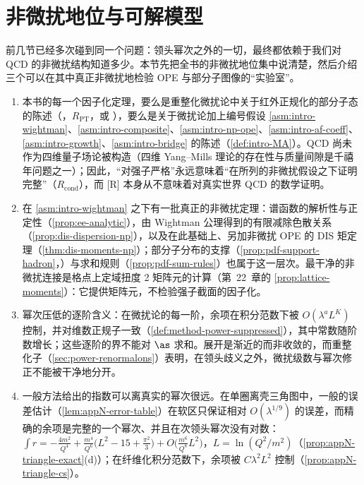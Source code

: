 \section{非微扰地位与可解模型}\label{sec:power-np}

前几节已经多次碰到同一个问题：领头幂次之外的一切，最终都依赖于我们对 QCD 的非微扰结构知道多少。本节先把全书的非微扰地位集中说清楚，然后介绍三个可以在其中真正非微扰地检验 OPE 与部分子图像的“实验室”。

\begin{remark}[非微扰地位]\label{rem:power-np-status}
\begin{enumerate}[label=(\roman*),leftmargin=1.8em,itemsep=2pt,topsep=2pt]
\item 本书的每一个因子化定理，要么是重整化微扰论中关于红外正规化的部分子态的陈述（\tagR，$R_{\mathrm{PT}}$，或 \tagA），要么是关于微扰论加上编号假设 \cref{asm:intro-wightman}、\cref{asm:intro-composite}、\cref{asm:intro-np-ope}、\cref{asm:intro-af-coeff}、\cref{asm:intro-growth}、\cref{asm:intro-bridge} 的陈述（\cref{def:intro-MA}）。QCD 尚未作为四维量子场论被构造（四维 Yang--Mills 理论的存在性与质量间隙是千禧年问题之一）；因此，“对强子严格”永远意味着“在所列的非微扰假设之下证明完整”（$R_{\mathrm{cond}}$），而 [R] 本身从不意味着对真实世界 QCD 的数学证明。%
\item 在 \cref{asm:intro-wightman} 之下有一批真正的非微扰定理：谱函数的解析性与正定性（\cref{prop:ee-analytic}），由 Wightman 公理得到的有限减除色散关系（\cref{prop:dis-dispersion-np}），以及在此基础上、另加非微扰 OPE 的 DIS 矩定理（\cref{thm:dis-moments-np}）；部分子分布的支撑（\cref{prop:pdf-support-hadron}，\tagA）与求和规则（\cref{prop:pdf-sum-rules}）也属于这一层次。最干净的非微扰连接是格点上定域扭度 2 矩阵元的计算（第~22~章的 \cref{prop:lattice-moments}）：它提供矩阵元，不检验强子截面的因子化。
\item 幂次压低的逐阶含义：在微扰论的每一阶，余项在积分范数下被 $O(\lambda^aL^K)$ 控制，并对维数正规子一致（\cref{def:method-power-suppressed}），其中常数随阶数增长；这些逐阶的界不能对 $\as$ 求和。展开是渐近的而非收敛的，而重整化子（\cref{sec:power-renormalons}）表明，在领头歧义之外，微扰级数与幂次修正不能被干净地分开。
\item 一般方法给出的指数可以离真实的幂次很远。在单圈离壳三角图中，一般的误差估计（\cref{lem:appN-error-table}）在软区只保证相对 $O(\lambda^{1/9})$ 的误差，而精确的余项是完整的一个幂次、并且在次领头幂次没有对数：$\int r=-\frac{4m^2}{Q^4}+\frac{m^4}{Q^6}\big(L^2-15+\frac{\pi^2}{3}\big)+O\big(\frac{m^6}{Q^8}L^2\big)$，$L=\ln(Q^2/m^2)$（\cref{prop:appN-triangle-exact}(d)）；在纤维化积分范数下，余项被 $C\lambda^2L^2$ 控制（\cref{prop:appN-triangle-cs}）。

\end{enumerate}
\end{remark}
